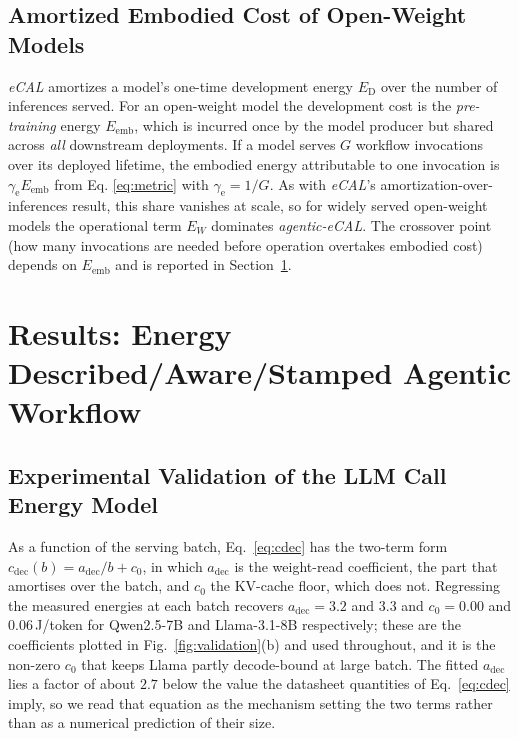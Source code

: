 \documentclass[journal]{IEEEtran}
\newif\ifshowchanges \showchangestrue
\newcommand{\OLD}{\ifshowchanges\color{black}\fi}
\newcommand{\ROOF}{\ifshowchanges\color{green!45!black}\fi}
\newcommand{\agecal}{\textit{agentic-eCAL}}
\newcommand{\ecal}{\textit{eCAL}}
\begin{document}
\subsection{Amortized Embodied Cost of Open-Weight Models}\label{sec:embodied}
\ecal{} amortizes a model's one-time development energy $E_{\mathrm{D}}$ over the number of
inferences served. For an open-weight model the development cost is the \emph{pre-training} energy
$E_{\mathrm{emb}}$, which is incurred once by the model producer but shared across \emph{all}
downstream deployments. If a model serves $G$ workflow invocations over its deployed lifetime, the
embodied energy attributable to one invocation is $\gamma_{\mathrm{e}}E_{\mathrm{emb}}$ from Eq. \ref{eq:metric} with  $\gamma_{\mathrm{e}}=1/G$. As with \ecal{}'s amortization-over-inferences result, this share
vanishes at scale, so for widely served open-weight models the operational term $E_W$ dominates
\agecal{}. The crossover point (how many invocations are needed before operation overtakes embodied cost) depends on $E_{\mathrm{emb}}$ and is reported in Section~\ref{sec:results-scale}.

\section{Results: Energy Described/Aware/Stamped Agentic Workflow}\label{sec:results-scale}

\subsection{Experimental Validation of the LLM Call Energy Model} 

\ROOF{}As a function of the serving batch, Eq.~\eqref{eq:cdec} has the two-term form
$c_{\mathrm{dec}}(b)=a_{\mathrm{dec}}/b+c_{0}$, in which $a_{\mathrm{dec}}$ is the weight-read
coefficient, the part that amortises over the batch, and $c_{0}$ the KV-cache floor, which does
not. Regressing the measured energies at each batch recovers $a_{\mathrm{dec}}=3.2$ and $3.3$
and $c_{0}=0.00$ and $0.06$\,J/token for Qwen2.5-7B and Llama-3.1-8B respectively; these are
the coefficients plotted in Fig.~\ref{fig:validation}(b) and used throughout, and it is the
non-zero $c_{0}$ that keeps Llama partly decode-bound at large batch. The fitted
$a_{\mathrm{dec}}$ lies a factor of about $2.7$ below the value the datasheet quantities of
Eq.~\eqref{eq:cdec} imply, so we read that equation as the mechanism setting the two terms
rather than as a numerical prediction of their size.\OLD{}
\end{document}
